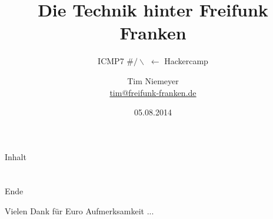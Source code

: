 \documentclass[12pt,hyperref={pdfpagelabels=false},notes=show]{beamer}
\title{Die Technik hinter Freifunk Franken}
\subtitle{ICMP7 $\#/\backslash$ $\leftarrow$ Hackercamp}
\author{Tim Niemeyer\\{\tiny \url{tim@freifunk-franken.de}}}
\institute{Freifunk Franken\\{\tiny \url{www.freifunk-franken.de}}}
\date[5.8.2014]{05.08.2014}
\begin{document}

\beamertemplatenavigationsymbolsempty
\begin{frame}
	\maketitle
\end{frame}\addtocounter{framenumber}{-1}


\begin{frame}{Inhalt}
    \hspace{0.1\textwidth}
    \parbox[c][0.8\textheight][s]{0.8\textwidth}{
        \tableofcontents
    }
\end{frame}










\section*{}
\begin{frame}{Ende}
    \begin{center}
        Vielen Dank für Euro Aufmerksamkeit	...
     \end{center}
\end{frame}\addtocounter{framenumber}{-1}
	
\section*{}


\end{document}
